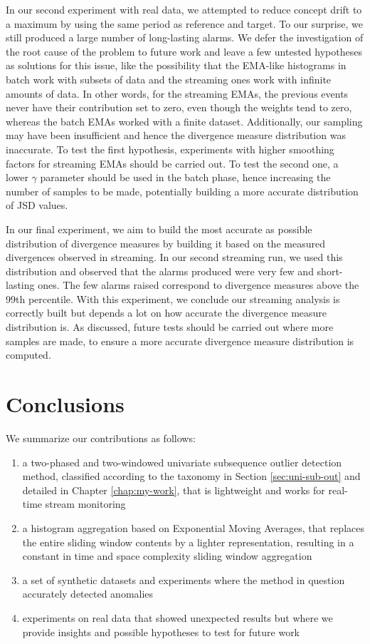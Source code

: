 \documentclass[sigconf]{acmart}
\begin{document}
In our second experiment with real data, we attempted to reduce concept drift to a maximum by using the same period as reference and target. To our surprise, we still produced a large number of long-lasting alarms. We defer the investigation of the root cause of the problem to future work and leave a few untested hypotheses as solutions for this issue, like the possibility that the EMA-like histograms in batch work with subsets of data and the streaming ones work with infinite amounts of data. In other words, for the streaming EMAs, the previous events never have their contribution set to zero, even though the weights tend to zero, whereas the batch EMAs worked with a finite dataset. Additionally, our sampling may have been insufficient and hence the divergence measure distribution was inaccurate. To test the first hypothesis, experiments with higher smoothing factors for streaming EMAs should be carried out. To test the second one, a lower $\gamma$ parameter should be used in the batch phase, hence increasing the number of samples to be made, potentially building a more accurate distribution of JSD values.

In our final experiment, we aim to build the most accurate as possible distribution of divergence measures by building it based on the measured divergences observed in streaming. In our second streaming run, we used this distribution and observed that the alarms produced were very few and short-lasting ones. The few alarms raised correspond to divergence measures above the 99th percentile. With this experiment, we conclude our streaming analysis is correctly built but depends a lot on how accurate the divergence measure distribution is. As discussed, future tests should be carried out where more samples are made, to ensure a more accurate divergence measure distribution is computed.


\section{Conclusions} \label{sec:Conclusions}
We summarize our contributions as follows:

\begin{enumerate}
    \item a two-phased and two-windowed univariate subsequence outlier detection method, classified according to the taxonomy in Section \ref{sec:uni-sub-out} and detailed in Chapter \ref{chap:my-work}, that is lightweight and works for real-time stream monitoring
    
    \item a histogram aggregation based on Exponential Moving Averages, that replaces the entire sliding window contents by a lighter representation, resulting in a constant in time and space complexity sliding window aggregation
    
    \item a set of synthetic datasets and experiments where the method in question accurately detected anomalies
    
    \item experiments on real data that showed unexpected results but where we provide insights and possible hypotheses to test for future work
\end{enumerate}
\end{document}
